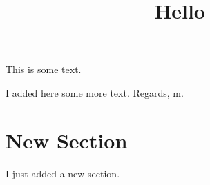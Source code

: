 \documentclass{article}
\title{Hello}
\begin{document}
\maketitle
	
This is some text.

I added here some more text.
Regards, m.

\section{New Section}

I just added a new section.
\end{document}
